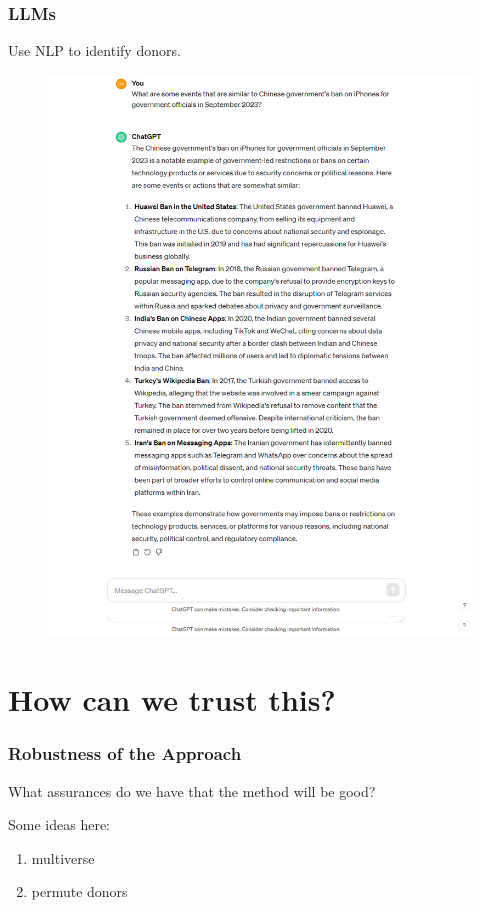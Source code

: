 \documentclass[9pt]{beamer}
\theoremstyle{definition}
\begin{document}
\begin{frame}\frametitle{LLMs}
    Use NLP to identify donors.

    \begin{figure}[H]
        \begin{center}
          \includegraphics[scale=.18]{iphone.png}
          \end{center}
        \end{figure}


     
\end{frame}

\section{How can we trust this?}

\begin{frame}\frametitle{Robustness of the Approach}
    What assurances do we have that the method will be good?

    \bigskip

    Some ideas here:

    \begin{enumerate}
    \item multiverse
    \item permute donors
    \end{enumerate}

    \end{frame}
\end{document}
